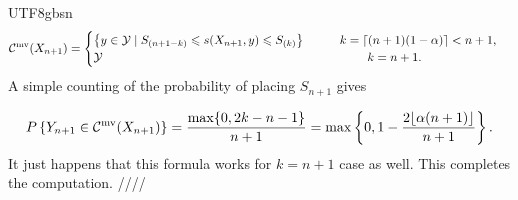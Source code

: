 \documentclass[../../main.tex]{subfiles}
\begin{document}
\begin{CJK*}{UTF8}{gbsn}
\begin{equation*}
    \mathcal{C}^{\text{mv}}(X_{n+1})
    = 
    \begin{cases}
        \curly{y\in \mathcal{Y} \mid S_{(n+1-k)}\leqslant s(X_{n+1},y)\leqslant S_{(k)}}
        \tab[1.0cm] k=\lceil(n+1)(1-\alpha)\rceil < n + 1, \\
        \mathcal{Y} \tab[7.7cm] k= n + 1.
    \end{cases}
\end{equation*}
A simple counting of the probability of placing $S_{n+1}$ gives

\begin{equation*}
    P\left \{ Y_{n+1} \in \mathcal{C}^{\text{mv}}(X_{n+1})  \right \}
    =\frac{\max\{0,2k-n-1\}}{n+1}
    =\max\left \{ 0,1-\frac{2\lfloor\alpha(n+1)\rfloor}{n+1} \right \}.
\end{equation*}
It just happens that this formula works for $k = n + 1$ case as well.
This completes the computation. ////

\end{CJK*}
\end{document}
